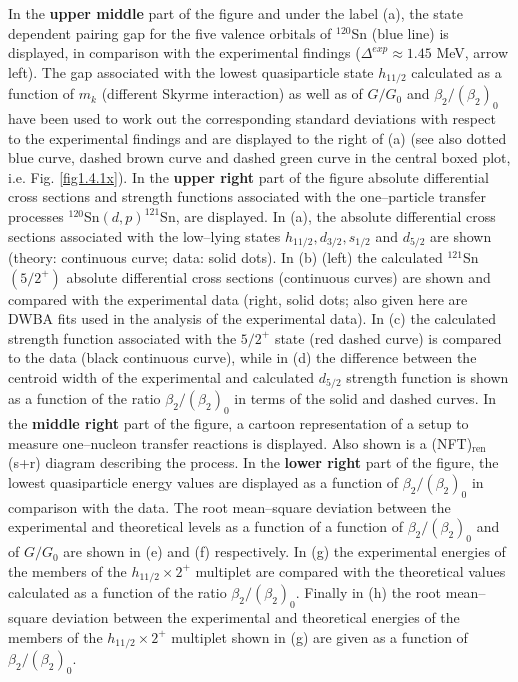   
  
  In the  \textbf{upper middle} part of the figure and under the label  (a), the state dependent pairing gap for the five valence orbitals of $^{120}$Sn (blue line) is displayed, in comparison with the experimental findings ($\Delta^{exp}\approx1.45$ MeV, arrow left). The gap associated with the lowest quasiparticle state $h_{11/2}$ calculated as a function of $m_k$ (different Skyrme interaction) as well as of $G/G_0$ and $\beta_2/(\beta_2)_0$ have been used to work out the corresponding   standard deviations with respect to the experimental findings and are displayed to the right of (a) (see also dotted blue curve, dashed brown curve and dashed green curve in the central boxed plot, i.e. Fig. \ref{fig1.4.1x}). In the  \textbf{upper right} part of the figure absolute differential cross sections and strength functions associated with the one--particle transfer processes $^{120}$Sn$(d,p)^{121}$Sn, are displayed. In  (a), the absolute differential cross sections associated with the low--lying  states $h_{11/2},d_{3/2},s_{1/2}$ and $d_{5/2}$ are shown (theory: continuous curve; data: solid dots). In (b) (left) the calculated $^{121}$Sn$(5/2^+)$ absolute differential cross sections (continuous curves) are shown and compared with the experimental data (right, solid dots; also given here are DWBA fits used in the analysis of the experimental data). In (c)  the calculated strength function associated with the $5/2^+$ state (red dashed curve) is compared to the data (black continuous curve), while in  (d) the difference between the centroid width of the experimental and calculated $d_{5/2}$ strength function  is shown as a function of the ratio $\beta_2/(\beta_2)_0$ in terms of the solid and dashed curves. In the \textbf{middle right} part of the figure, a cartoon representation of a setup to measure one--nucleon transfer reactions is displayed. Also shown is a (NFT)$_{\text{ren}}$(s+r) diagram  describing the process.  In the \textbf{lower right} part of the figure, the lowest quasiparticle energy values are displayed as a function of $\beta_2/(\beta_2)_0$ in comparison with the data.  The root mean--square deviation between the experimental and theoretical levels as a function of a function of  $\beta_2/(\beta_2)_0$ and  of $G/G_0$ are shown in (e) and (f) respectively. In (g) the  experimental energies of the members of the $h_{11/2}\times 2^+$ multiplet are compared with the theoretical values calculated as a function of the ratio $\beta_2/(\beta_2)_0$. Finally in (h) the root mean--square deviation between the experimental and theoretical energies of the members of the $h_{11/2}\times 2^+$ multiplet shown in (g) are given as a function of $\beta_2/(\beta_2)_0$. 
  
